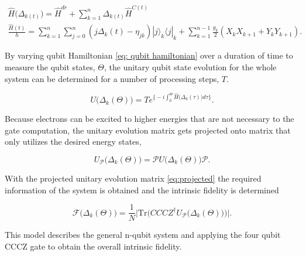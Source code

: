 \begin{gather}
    \label{eq: qubit hamiltonian}
    \hat{H} \big( \Delta_{k(t)} \big) = \hat{H}^{dr} + \sum^{n}_{k=1} \Delta_{k(t)} \hat{H}^{C(t)} \\
    \frac{\hat{H}(t)}{h} = \sum^n_{k=1} \sum^n_{j=0} (j\Delta_k(t)-\eta_{jk}) |j \big\rangle_k \big\langle j |_k + \sum^{n-1}_{k=1} \frac{g_k}{2} (X_kX_{k+1}+Y_kY_{k+1}).
\end{gather}

By varying qubit Hamiltonian \ref{eq: qubit hamiltonian} over a duration of time to measure the qubit states, $\Theta$, the unitary qubit state evolution for the whole system can be determined for a number of processing steps, $T$. 

\begin{equation}
  \label{eq:evolution operator}
    U\big( \Delta_k(\Theta) \big) = T e^{\Big\{ -i \int_{0}^{\Theta} \hat{H}\big( \Delta_k(\tau) \big) d\tau \Big\} }. 
\end{equation}

Because electrons can be excited to higher energies that are not necessary to the gate computation, the unitary evolution matrix gets projected onto matrix that only utilizes the desired energy states,  

\begin{equation}
    \label{eq:projected}
  U_\mathscr{P}\big(\Delta_k(\Theta) \big) =  \mathscr{P}U\big(\Delta_k(\Theta) \big) \mathscr{P}.
\end{equation}

With the projected unitary evolution matrix \ref{eq:projected} the required information of the system is obtained and the intrinsic fidelity is determined

\begin{equation}
    \mathscr{F}\big(\Delta_k(\Theta)\big)=\frac{1}{N}\Bigg| \mathrm{Tr}\bigg( CCCZ^{\dagger} U_\mathscr{P}\big(\Delta_k(\Theta) \big) \bigg) \Bigg|.
\end{equation}


This model describes the general n-qubit system and applying the four qubit CCCZ gate to obtain the overall intrinsic fidelity.
